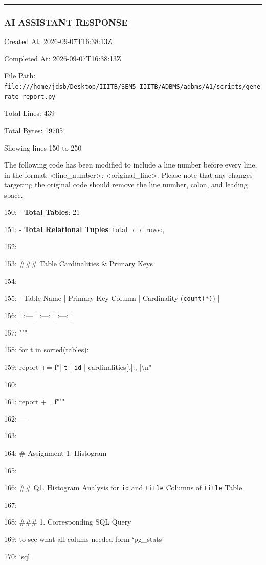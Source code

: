 \documentclass[11pt,a4paper]{article}
\begin{document}
\hrule

\subsubsection{AI ASSISTANT RESPONSE}

Created At: 2026-09-07T16:38:13Z

Completed At: 2026-09-07T16:38:13Z

File Path: \texttt{file:///home/jdsb/Desktop/IIITB/SEM5\_IIITB/ADBMS/adbms/A1/scripts/generate\_report.py}

Total Lines: 439

Total Bytes: 19705

Showing lines 150 to 250

The following code has been modified to include a line number before every line, in the format: <line\_number>: <original\_line>. Please note that any changes targeting the original code should remove the line number, colon, and leading space.

150: - \textbf{Total Tables}: 21

151: - \textbf{Total Relational Tuples}: {total\_db\_rows:,}

152:

153: \#\#\# Table Cardinalities \& Primary Keys

154:

155: | Table Name | Primary Key Column | Cardinality (\texttt{count(*)}) |

156: | :--- | :---: | :---: |

157: """

158:     for t in sorted(tables):

159:         report += f"| \texttt{{t}} | \texttt{id} | {cardinalities[t]:,} |\textbackslash{}n"

160:

161:     report += f"""

162: ---

163:

164: \# Assignment 1: Histogram

165:

166: \#\# Q1. Histogram Analysis for \texttt{id} and \texttt{title} Columns of \texttt{title} Table

167:

168: \#\#\# 1. Corresponding SQL Query

169: to see what all colums needed form `pg\_stats'

170: \texttt{}`sql
\end{document}
